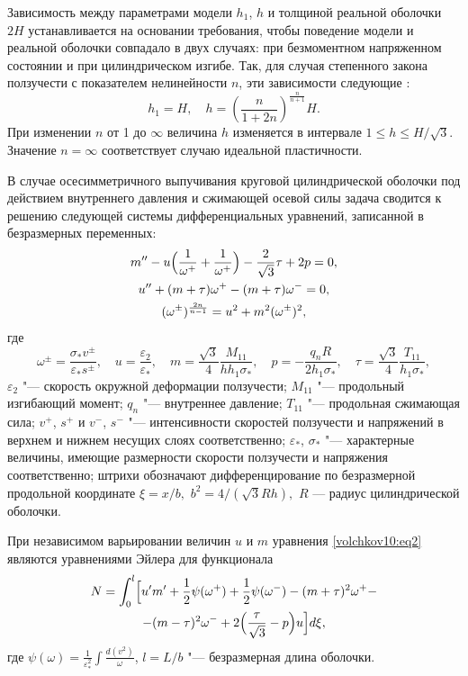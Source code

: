 Зависимость между параметрами модели $h_1$, $h$ и толщиной реальной оболочки $2H$
устанавливается на основании требования, чтобы поведение модели и реальной оболочки
совпадало в двух случаях: при безмоментном напряженном состоянии и  при цилиндрическом
изгибе. Так, для случая степенного закона ползучести с показателем нелинейности $n$, эти
зависимости следующие \cite{rabotnov:R2}:
\begin{equation}
\label{volchkov10:eq1}
h_1 = H,\quad h = \left(\frac{n}{1+2n}\right)^{\frac{n}{n+1}}H.
\end{equation}
При изменении $n$ от 1 до $\infty$ величина $h$ изменяется в интервале $1 \leq h \leq
H/\sqrt{3}.$ Значение $n =\infty$ соответствует случаю идеальной пластичности.

В случае осесимметричного выпучивания круговой цилиндрической оболочки под действием
внутреннего давления и сжимающей осевой силы задача сводится к решению следующей системы
дифференциальных уравнений, записанной в безразмерных переменных:
\begin{gather}
 \notag
m''-u \Bigl(\frac{1}{\omega^{+}}+\frac{1}{\omega^{+}} \Bigr)-\frac{2}{\sqrt{3}}
\tau+2p=0,\\ \label{volchkov10:eq2}
u''+(m+\tau)\omega^{+}-(m+\tau)\omega^{-} =0,\\\notag
(\omega^{\pm})^{\frac{2n}{n-1}}=u^2+m^2(\omega^{\pm})^2,
\end{gather}
где
\begin{equation}
\label{volchkov10:eq3}
\omega^{\pm}=\frac{\sigma_\ast v^{\pm}}{\varepsilon_\ast s^{\pm}},\quad u=\frac{\varepsilon_2
}{\varepsilon_\ast},\quad m=\frac{\sqrt{3}}{4}\frac{M_{11}}{hh_1\sigma_\ast},\quad
p=-\frac{q_nR}{2h_1\sigma_\ast},\quad  \tau=\frac{\sqrt{3}}{4}\frac{T_{11}}{h_1\sigma_\ast},
\end{equation}
$\varepsilon_2$ "--- скорость окружной деформации ползучести; $M_{11}$ "--- продольный
изгибающий момент; $q_n$ "--- внутреннее давление; $T_{11}$ "--- продольная сжимающая сила;
$v^{+}$, $s^{+}$ и $v^{-}$, $s^{-}$ "--- интенсивности скоростей ползучести и напряжений в
верхнем и нижнем несущих слоях соответственно; $\varepsilon_\ast$, $\sigma_\ast$ "---
характерные величины, имеющие размерности скорости ползучести и напряжения
соответственно; штрихи обозначают дифференцирование по безразмерной продольной координате
$\xi=x/b,$ $b^2=4/(\sqrt{3}Rh),$ $R$ --- радиус цилиндрической оболочки.

При независимом варьировании величин  $u$ и $m$ уравнения \eqref{volchkov10:eq2} являются
уравнениями Эйлера для функционала
\begin{multline}
\label{volchkov10:eq4}
N=\int_0^l \Bigl[u' m'+\frac{1}{2}\psi(\omega^{+})
+\frac{1}{2}\psi(\omega^{-})-(m+\tau)^2\omega^{+}-\\
-(m-\tau)^2\omega^{-}+2\Bigl(\frac{\tau}{\sqrt{3}}-p \Bigr)u \Bigr]d\xi,
\end{multline}
где
$ \displaystyle
\psi(\omega)=\frac{1}{\varepsilon_\ast^2}\int\frac{d(v^2)}{\omega}$,
$l=L/b$ "--- безразмерная длина оболочки.

